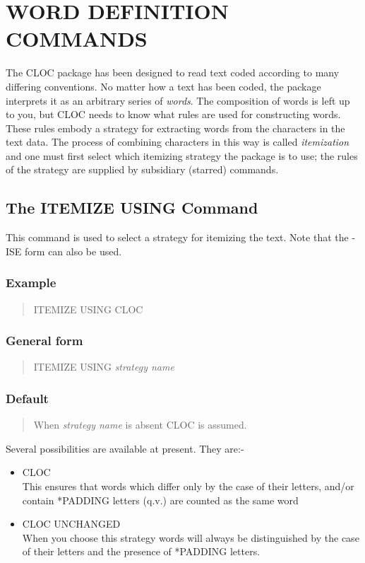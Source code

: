 \section{WORD DEFINITION COMMANDS}
The CLOC package has been designed to read text coded according to
many differing conventions.  No matter how a text has been coded, the
package interprets it as an arbitrary series of {\em words}. The composition
of words is left up to you, but CLOC needs to know
what rules are used for constructing words. These rules embody a
strategy for extracting words from the characters in the text data.
The process of combining characters in this way is called {\em itemization}
and one must first select which itemizing strategy the package is to use;
the rules of the strategy are supplied by subsidiary (starred) commands.

\subsection{The ITEMIZE USING Command}
This command is used to select a strategy for itemizing the text.
Note that the -ISE form can also be used.

\subsubsection{Example}
\begin{quote}
ITEMIZE USING       CLOC
\end{quote}

\subsubsection{General form}
\begin{quote}
ITEMIZE USING       {\em strategy name}
\end{quote}

\subsubsection{Default}
\begin{quote}
When {\em strategy name} is absent CLOC is assumed.
\end{quote}

Several possibilities are available at present. They are:-
\begin{itemize}
\item CLOC\\
      This ensures that words which differ only by the case of their
      letters, and/or contain *PADDING letters (q.v.) are counted as the same
      word
\item CLOC UNCHANGED\\
      When you choose this strategy words will always be distinguished by
      the case of their letters and the presence of *PADDING letters.
\end{itemize}

